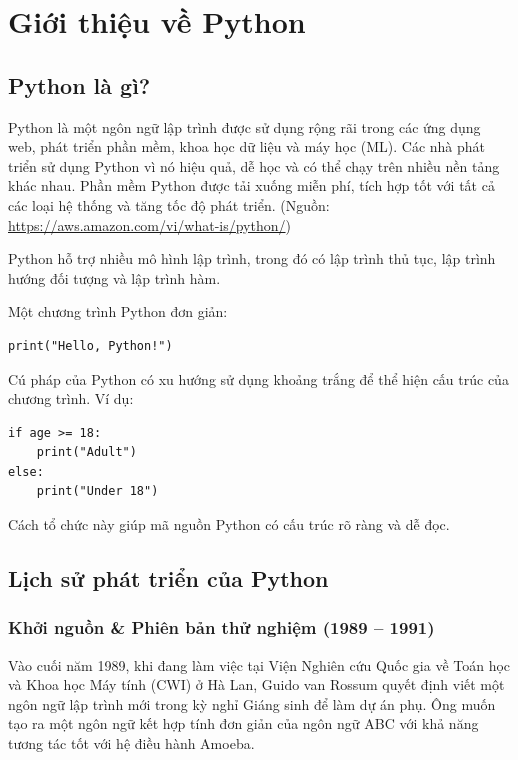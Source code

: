 \chapter{Giới thiệu về Python}

\section{Python là gì?}

Python là một ngôn ngữ lập trình được sử dụng rộng rãi trong các ứng dụng web, phát triển phần mềm, khoa học dữ liệu và máy học (ML). Các nhà phát triển sử dụng Python vì nó hiệu quả, dễ học và có thể chạy trên nhiều nền tảng khác nhau. Phần mềm Python được tải xuống miễn phí, tích hợp tốt với tất cả các loại hệ thống và tăng tốc độ phát triển. (Nguồn: \url{https://aws.amazon.com/vi/what-is/python/})

Python hỗ trợ nhiều mô hình lập trình, trong đó có lập trình thủ tục, lập trình hướng đối tượng và lập trình hàm. 

Một chương trình Python đơn giản:

\begin{lstlisting}
print("Hello, Python!")
\end{lstlisting}

Cú pháp của Python có xu hướng sử dụng khoảng trắng để thể hiện cấu trúc của chương trình. Ví dụ:

\begin{lstlisting}
if age >= 18:
    print("Adult")
else:
    print("Under 18")
\end{lstlisting}

Cách tổ chức này giúp mã nguồn Python có cấu trúc rõ ràng và dễ đọc.

\section{Lịch sử phát triển của Python}

\subsection{Khởi nguồn \& Phiên bản thử nghiệm (1989 – 1991)}
Vào cuối năm 1989, khi đang làm việc tại Viện Nghiên cứu Quốc gia về Toán học và Khoa học Máy tính (CWI) ở Hà Lan, Guido van Rossum quyết định viết một ngôn ngữ lập trình mới trong kỳ nghỉ Giáng sinh để làm dự án phụ. Ông muốn tạo ra một ngôn ngữ kết hợp tính đơn giản của ngôn ngữ ABC với khả năng tương tác tốt với hệ điều hành Amoeba.

